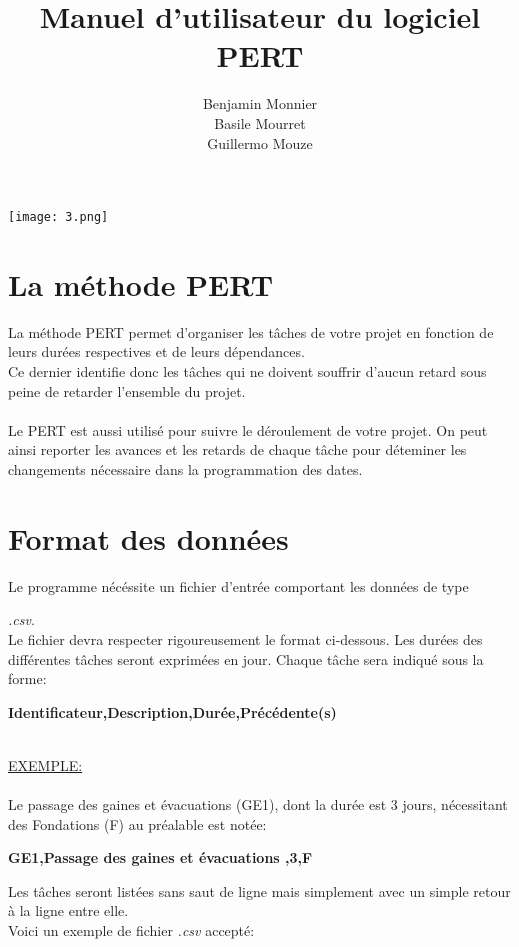 \documentclass{article}
\title{\bf \Huge Manuel d'utilisateur du logiciel PERT}
\author{Benjamin Monnier\\ Basile Mourret\\ Guillermo Mouze}
\date{}
\begin{document}
\maketitle
\centerline{\texttt{[image: 3.png]}}
\section{La méthode PERT}
La méthode PERT permet d’organiser les tâches de votre projet en fonction de leurs durées respectives et de
leurs dépendances.
\\ 
Ce dernier identifie donc les tâches qui ne doivent souffrir d’aucun retard sous peine de retarder l’ensemble du projet.
\\\\
Le PERT est aussi utilisé pour suivre le déroulement de votre projet. On
peut ainsi reporter les avances et les retards de chaque tâche pour déteminer les changements nécessaire dans la programmation des dates. 


\section{Format des données}

Le programme nécéssite un fichier d'entrée comportant les données de type 

\textit{.csv}.
\\
Le fichier devra respecter rigoureusement le format ci-dessous.
Les durées des différentes tâches seront exprimées en jour.
Chaque tâche sera indiqué sous la forme:


\begin{flushleft}
    \bf
Identificateur,Description,Durée,Précédente(s)
\end{flushleft}
\\
\underline{EXEMPLE:}
\\\\
Le passage des gaines et évacuations (GE1), dont la durée est 3 jours, nécessitant des Fondations (F) au préalable est notée:
\begin{flushleft}
    \bf
  GE1,Passage des gaines et évacuations ,3,F
\end{flushleft}

Les tâches seront listées sans saut de ligne mais simplement avec un simple retour à la ligne entre elle.
\\
Voici un exemple de fichier \textit{.csv} accepté:
\\\\
\end{document}
